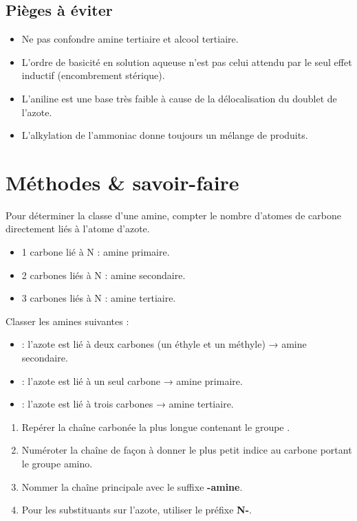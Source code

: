 \begin{synthese}
\subsection*{Pièges à éviter}
\begin{itemize}
    \item Ne pas confondre amine tertiaire et alcool tertiaire.
    \item L'ordre de basicité en solution aqueuse n'est pas celui attendu par le seul effet inductif (encombrement stérique).
    \item L'aniline est une base très faible à cause de la délocalisation du doublet de l'azote.
    \item L'alkylation de l'ammoniac donne toujours un mélange de produits.
\end{itemize}
\end{synthese}

\section{Méthodes \& savoir-faire}

Pour déterminer la classe d'une amine, compter le nombre d'atomes de carbone directement liés à l'atome d'azote.
\begin{itemize}
    \item 1 carbone lié à N : amine primaire.
    \item 2 carbones liés à N : amine secondaire.
    \item 3 carbones liés à N : amine tertiaire.
\end{itemize}

\begin{exemple}
Classer les amines suivantes :
\begin{itemize}
    \item {} : l'azote est lié à deux carbones (un éthyle et un méthyle) → amine secondaire.
    \item {} : l'azote est lié à un seul carbone → amine primaire.
    \item {} : l'azote est lié à trois carbones → amine tertiaire.
\end{itemize}
\end{exemple}

\begin{enumerate}
    \item Repérer la chaîne carbonée la plus longue contenant le groupe .
    \item Numéroter la chaîne de façon à donner le plus petit indice au carbone portant le groupe amino.
    \item Nommer la chaîne principale avec le suffixe \textbf{-amine}.
    \item Pour les substituants sur l'azote, utiliser le préfixe \textbf{N-}.
\end{enumerate}

